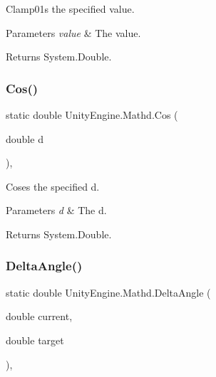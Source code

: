Clamp01s the specified value. 


\begin{DoxyParams}{Parameters}
{\em value} & The value.\\
\hline
\end{DoxyParams}
\begin{DoxyReturn}{Returns}
System.\+Double.
\end{DoxyReturn}
\mbox{\label{struct_unity_engine_1_1_mathd_a3b6033b84f3620261fe0a093a5d634ac}} 
\subsubsection{\texorpdfstring{Cos()}{Cos()}}
{\footnotesize\ttfamily static double Unity\+Engine.\+Mathd.\+Cos (\begin{DoxyParamCaption}\item[{double}]{d }\end{DoxyParamCaption})\hspace{0.3cm}{\ttfamily [inline]}, {\ttfamily [static]}}



Coses the specified d. 


\begin{DoxyParams}{Parameters}
{\em d} & The d.\\
\hline
\end{DoxyParams}
\begin{DoxyReturn}{Returns}
System.\+Double.
\end{DoxyReturn}
\mbox{\label{struct_unity_engine_1_1_mathd_ab4a58f606d08c3756e70966e7d3be0e9}} 
\subsubsection{\texorpdfstring{Delta\+Angle()}{DeltaAngle()}}
{\footnotesize\ttfamily static double Unity\+Engine.\+Mathd.\+Delta\+Angle (\begin{DoxyParamCaption}\item[{double}]{current,  }\item[{double}]{target }\end{DoxyParamCaption})\hspace{0.3cm}{\ttfamily [inline]}, {\ttfamily [static]}}



